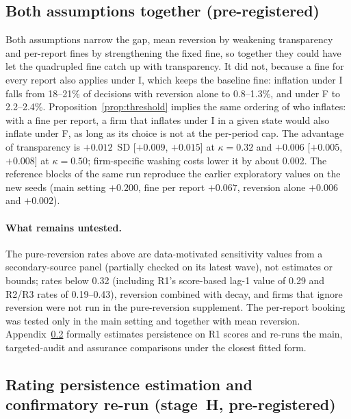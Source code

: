 \documentclass[11pt]{article}
\begin{document}
\subsection{Both assumptions together (pre-registered)}\label{app:joint}

Both assumptions narrow the gap, mean reversion by weakening transparency and per-report fines by strengthening the fixed fine, so together they could have let the quadrupled fine catch up with transparency. It did not, because a fine for every report also applies under I, which keeps the baseline fine: inflation under I falls from 18--21\% of decisions with reversion alone to 0.8--1.3\%, and under F to 2.2--2.4\%. Proposition~\ref{prop:threshold} implies the same ordering of who inflates: with a fine per report, a firm that inflates under I in a given state would also inflate under F, as long as its choice is not at the per-period cap. The advantage of transparency is $+0.012$~SD [$+0.009$, $+0.015$] at $\kappa = 0.32$ and $+0.006$ [$+0.005$, $+0.008$] at $\kappa = 0.50$; firm-specific washing costs lower it by about 0.002. The reference blocks of the same run reproduce the earlier exploratory values on the new seeds (main setting $+0.200$, fine per report $+0.067$, reversion alone $+0.006$ and $+0.002$).

\paragraph{What remains untested.} The pure-reversion rates above are data-motivated sensitivity values from a secondary-source panel (partially checked on its latest wave), not estimates or bounds; rates below 0.32 (including R1's score-based lag-1 value of 0.29 and R2/R3 rates of 0.19--0.43), reversion combined with decay, and firms that ignore reversion were not run in the pure-reversion supplement. The per-report booking was tested only in the main setting and together with mean reversion. Appendix~\ref{app:persistence} formally estimates persistence on R1 scores and re-runs the main, targeted-audit and assurance comparisons under the closest fitted form.

\subsection{Rating persistence estimation and confirmatory re-run (stage~H, pre-registered)}\label{app:persistence}
\end{document}
